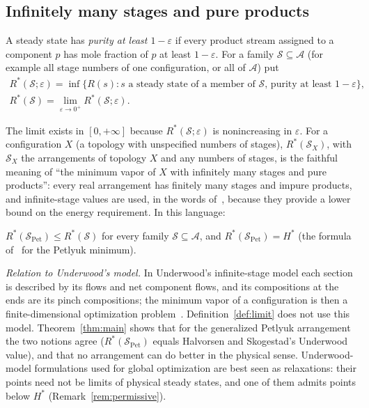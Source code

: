 \documentclass[11pt,a4paper]{report}
\newcommand{\cA}{\mathcal A}
\newcommand{\cS}{\mathcal S}
\newcommand{\Hs}{H^{*}}
\newcommand{\Spet}{\cS_{\mathrm{Pet}}}
\begin{document}
\subsection{Infinitely many stages and pure products}\label{sec:limit}

\begin{definition}\label{def:limit}
A steady state has \emph{purity at least \(1-\varepsilon\)} if every product stream assigned to a component \(p\) has mole
fraction of \(p\) at least \(1-\varepsilon\). For a family \(\cS\subseteq\cA\) (for example all stage numbers of one
configuration, or all of \(\cA\)) put
\begin{gather*}
R^*(\cS;\varepsilon)=\inf\{R(s):s\text{ a steady state of a member of }\cS\text{, purity at least }1-\varepsilon\},\\
R^*(\cS)=\lim_{\varepsilon\to0^+}R^*(\cS;\varepsilon).
\end{gather*}
\end{definition}
The limit exists in \([0,+\infty]\) because \(R^*(\cS;\varepsilon)\) is nonincreasing in \(\varepsilon\). For a configuration
\(X\) (a topology with unspecified numbers of stages), \(R^*(\cS_X)\), with \(\cS_X\) the arrangements of topology \(X\) and
any numbers of stages, is the faithful meaning of ``the minimum vapor of \(X\) with infinitely many stages and pure
products'': every real arrangement has finitely many stages and impure products, and infinite-stage values are used,
in the words of~\autocite{HS02}, because they provide a lower bound on the energy requirement. In this language:

\begin{definition}[the Halvorsen--Skogestad conjecture in \(\cA\)]\label{def:conj}
\(R^*(\Spet)\le R^*(\cS)\) for every family \(\cS\subseteq\cA\), and \(R^*(\Spet)=\Hs\) (the formula of~\autocite{HS3} for
the Petlyuk minimum).
\end{definition}

\emph{Relation to Underwood's model.} In Underwood's infinite-stage model each section is described by its flows and net
component flows, and its compositions at the ends are its pinch compositions; the minimum vapor of a configuration is
then a finite-dimensional optimization problem~\autocite{HS3,Nallasivam2016,TGAT}. Definition~\ref{def:limit} does not
use this model. Theorem~\ref{thm:main} shows that for the generalized Petlyuk arrangement the two notions agree
(\(R^*(\Spet)\) equals Halvorsen and Skogestad's Underwood value), and that no arrangement can do better in the physical
sense. Underwood-model formulations used for global optimization are best seen as relaxations: their points need not be
limits of physical steady states, and one of them admits points below \(\Hs\) (Remark~\ref{rem:permissive}).
\end{document}
